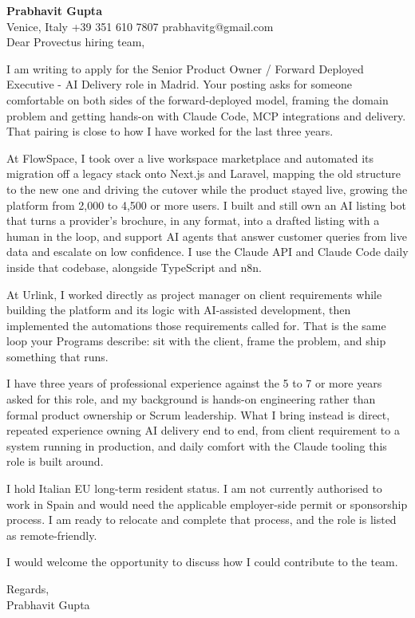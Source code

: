 \documentclass[a4paper,10.5pt]{article}
\begin{document}
\textbf{Prabhavit Gupta}\\
Venice, Italy \textbar{} +39 351 610 7807 \textbar{} prabhavitg@gmail.com\\[10pt]
Dear Provectus hiring team,

I am writing to apply for the Senior Product Owner / Forward Deployed Executive - AI Delivery role in Madrid. Your posting asks for someone comfortable on both sides of the forward-deployed model, framing the domain problem and getting hands-on with Claude Code, MCP integrations and delivery. That pairing is close to how I have worked for the last three years.

At FlowSpace, I took over a live workspace marketplace and automated its migration off a legacy stack onto Next.js and Laravel, mapping the old structure to the new one and driving the cutover while the product stayed live, growing the platform from 2,000 to 4,500 or more users. I built and still own an AI listing bot that turns a provider's brochure, in any format, into a drafted listing with a human in the loop, and support AI agents that answer customer queries from live data and escalate on low confidence. I use the Claude API and Claude Code daily inside that codebase, alongside TypeScript and n8n.

At Urlink, I worked directly as project manager on client requirements while building the platform and its logic with AI-assisted development, then implemented the automations those requirements called for. That is the same loop your Programs describe: sit with the client, frame the problem, and ship something that runs.

I have three years of professional experience against the 5 to 7 or more years asked for this role, and my background is hands-on engineering rather than formal product ownership or Scrum leadership. What I bring instead is direct, repeated experience owning AI delivery end to end, from client requirement to a system running in production, and daily comfort with the Claude tooling this role is built around.

I hold Italian EU long-term resident status. I am not currently authorised to work in Spain and would need the applicable employer-side permit or sponsorship process. I am ready to relocate and complete that process, and the role is listed as remote-friendly.

I would welcome the opportunity to discuss how I could contribute to the team.

Regards,\\
Prabhavit Gupta
\end{document}

